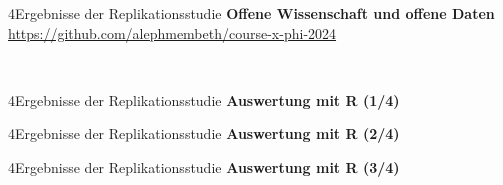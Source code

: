 \documentclass[xcolor=table,9pt,aspectratio=169]{beamer}
\begin{document}
\begin{frame}{\vspace*{10mm}4\hspace*{1em}Ergebnisse der Replikationsstudie}
\textbf{Offene Wissenschaft und offene Daten}\\
\smallskip
\url{https://github.com/alephmembeth/course-x-phi-2024}

\bigskip
\begin{center}
   \\
\end{center}
\end{frame}


\begin{frame}{\vspace*{10mm}4\hspace*{1em}Ergebnisse der Replikationsstudie}
\textbf{Auswertung mit R (1/4)}\\
\smallskip
\lstset{style=mystyle}

\end{frame}


\begin{frame}{\vspace*{10mm}4\hspace*{1em}Ergebnisse der Replikationsstudie}
\textbf{Auswertung mit R (2/4)}\\
\smallskip
\lstset{style=mystyle}

\end{frame}


\begin{frame}{\vspace*{10mm}4\hspace*{1em}Ergebnisse der Replikationsstudie}
\textbf{Auswertung mit R (3/4)}\\
\smallskip
\lstset{style=mystyle}

\end{frame}
\end{document}
